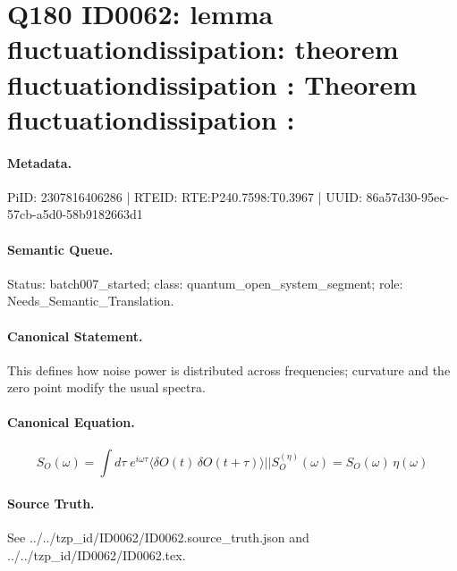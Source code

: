 \section*{Q180 ID0062: lemma fluctuationdissipation: theorem fluctuationdissipation : Theorem fluctuationdissipation :}
\paragraph{Metadata.}
PiID: 2307816406286 | RTEID: RTE:P240.7598:T0.3967 | UUID: 86a57d30-95ec-57cb-a5d0-58b9182663d1

\paragraph{Semantic Queue.}
Status: batch007\_started; class: quantum\_open\_system\_segment; role: Needs\_Semantic\_Translation.

\paragraph{Canonical Statement.}
This defines how noise power is distributed across frequencies; curvature and the zero point modify the usual spectra.

\paragraph{Canonical Equation.}
\[
S_{O}(\omega) = \int d\tau\; e^{i\omega\tau} \langle \delta O(t)\,\delta O(t+\tau)\rangle || S_{O}^{(\eta)}(\omega) = S_{O}(\omega)\,\eta(\omega)
\]

\paragraph{Source Truth.}
See ../../tzp\_id/ID0062/ID0062.source\_truth.json and ../../tzp\_id/ID0062/ID0062.tex.
